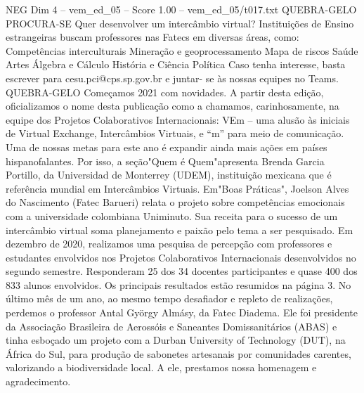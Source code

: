 \begin{textsample}{NEG Dim 4 – vem\_ed\_05 – Score 1.00 – vem\_ed\_05/t017.txt}  \label{ex:f4_neg_076}
QUEBRA-GELO PROCURA-SE Quer desenvolver um intercâmbio virtual?
Instituições de Ensino estrangeiras buscam professores nas Fatecs em diversas áreas, como: Competências interculturais Mineração e geoprocessamento Mapa de riscos Saúde Artes Álgebra e Cálculo História e Ciência Política Caso tenha interesse, basta escrever para cesu.pci@cps.sp.gov.br e juntar- se às nossas equipes no Teams.
QUEBRA-GELO Começamos 2021 com novidades.
A partir desta edição, oficializamos o nome desta publicação como a chamamos, carinhosamente, na equipe dos Projetos Colaborativos Internacionais: VEm – uma alusão às iniciais de Virtual Exchange, Intercâmbios Virtuais, e “m” para meio de comunicação.
Uma de nossas metas para este ano é expandir ainda mais ações em países hispanofalantes.
Por isso, a seção"Quem é Quem"apresenta Brenda Garcia Portillo, da Universidad de Monterrey (UDEM), instituição mexicana que é referência mundial em Intercâmbios Virtuais.
Em"Boas Práticas", Joelson Alves do Nascimento (Fatec Barueri) relata o projeto sobre competências emocionais com a universidade colombiana Uniminuto.
Sua receita para o sucesso de um intercâmbio virtual soma planejamento e paixão pelo tema a ser pesquisado.
Em dezembro de 2020, realizamos uma pesquisa de percepção com professores e estudantes envolvidos nos Projetos Colaborativos Internacionais desenvolvidos no segundo semestre.
Responderam 25 dos 34 docentes participantes e quase 400 dos 833 alunos envolvidos.
Os principais resultados estão resumidos na página 3.
No último mês de um ano, ao mesmo tempo desafiador e repleto de realizações, perdemos o professor Antal György Almásy, da Fatec Diadema.
Ele foi presidente da Associação Brasileira de Aerossóis e Saneantes Domissanitários (ABAS) e tinha esboçado um projeto com a Durban University of Technology (DUT), na África do Sul, para produção de sabonetes artesanais por comunidades carentes, valorizando a biodiversidade local.
A ele, prestamos nossa homenagem e agradecimento.

\end{textsample}
